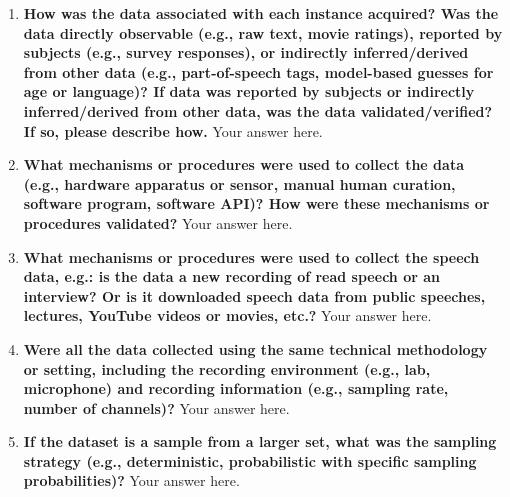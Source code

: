 \documentclass{article}
\begin{document}
    \noindent{}
    \begin{enumerate}[leftmargin=0.65cm]
        \scriptsize
        \item \textbf{How was the data associated with each instance acquired? Was the data directly observable (e.g., raw text, movie ratings), reported by subjects (e.g., survey responses), or indirectly inferred/derived from other data (e.g., part-of-speech tags, model-based guesses for age or language)? If data was reported by subjects or indirectly inferred/derived from other data, was the data validated/verified? If so, please describe how.}
        \newline 
        Your answer here.
        \newline 
        
        \item \textbf{What mechanisms or procedures were used to collect the data (e.g., hardware apparatus or sensor, manual human curation, software program, software API)? How were these mechanisms or procedures validated?}
        \newline 
        Your answer here.
        \newline 
        
        \item \textbf{What mechanisms or procedures were used to collect the speech data, e.g.: is the data a new recording of read speech or an interview? Or is it downloaded speech data from public speeches, lectures, YouTube videos or movies, etc.?}
        \newline 
        Your answer here.
        \newline 
        
        \item \textbf{Were all the data collected using the same technical methodology or setting, including the recording environment (e.g., lab, microphone) and recording information (e.g., sampling rate, number of channels)?}
        \newline 
        Your answer here.
        \newline 
        
        \item \textbf{If the dataset is a sample from a larger set, what was the sampling strategy (e.g., deterministic, probabilistic with specific sampling probabilities)?}
        \newline 
        Your answer here.
        \newline 
        

\end{enumerate}
\end{document}
